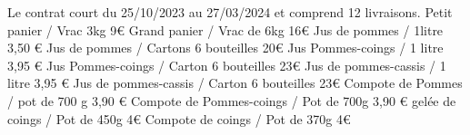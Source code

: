 \documentclass[10pt,a4paper,french]{article}
\begin{document}
\noindent Le contrat court du 25/10/2023 au 27/03/2024 et comprend 12 livraisons.\newline\newline
{\color{Blue} Petit panier / Vrac 3kg 9€}\newline
{\color{Blue} Grand panier / Vrac de 6kg 16€}\newline
{\color{Blue} Jus de pommes / 1litre 3,50 €}\newline
{\color{Blue} Jus de pommes / Cartons 6 bouteilles 20€}\newline
{\color{Blue} Jus Pommes-coings / 1 litre 3,95 €}\newline
{\color{Blue} Jus Pommes-coings / Carton 6 bouteilles 23€}\newline
{\color{Blue} Jus de pommes-cassis / 1 litre 3,95 € }\newline
{\color{Blue} Jus de pommes-cassis / Carton 6 bouteilles 23€ }\newline
{\color{Blue} Compote de Pommes / pot de 700 g 3,90 € }\newline
{\color{Blue} Compote de Pommes-coings / Pot de 700g 3,90 € }\newline
{\color{Blue} gelée de coings / Pot de 450g 4€}\newline
{\color{Blue} Compote de coings  / Pot de 370g 4€}
\end{document}
